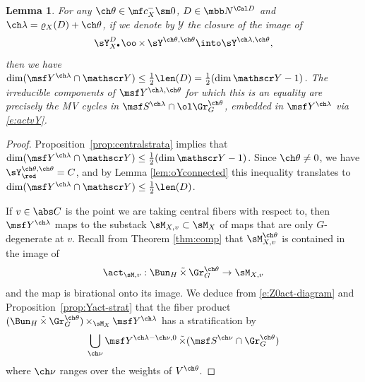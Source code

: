 \documentclass[final]{amsart}
\newtheorem{lem}[subsubsection]{Lemma}
\theoremstyle{remark}
\theoremstyle{definition}
\DeclareMathOperator*{\ttimes}{\tilde\times}
\DeclareMathOperator*{\xt}{\times}
\numberwithin{equation}{section}
\begin{document}
\begin{lem} \label{lem:centralfibertheta}
For any $\ch\theta \in \mf c_X^- \sm 0$, $D\in \mbb N^{\Cal D}$
and $\ch\lambda = \varrho_X(D) +\ch\theta$, if we denote by $\mathscr Y$ the closure of the image of 
\[\sY^{D}_{X^\bullet} \oo\xt \sY^{\ch\theta,\ch\theta} \into \sY^{\ch\lambda,\ch\theta},
\]
then we have $\dim (\msf Y^{\ch\lambda}\cap \mathscr Y) \le \frac 1 2\len(D) = \frac 1 2(\dim \mathscr Y -1)$. The irreducible components of $\msf Y^{\ch\lambda,\ch\theta}$ for which this is an equality are precisely 
the MV cycles in $\msf S^{\ch\lambda}\cap \ol\Gr^{\ch\theta}_G$, 
embedded in $\msf Y^{\ch\lambda}$ via \eqref{e:actvY}.
\end{lem}
\begin{proof}
Proposition~\ref{prop:centralstrata} implies that $\dim(\msf Y^{\ch\lambda} \cap \mathscr Y)
\le \frac 1 2(\dim \mathscr Y -1)$. 
Since $\ch\theta\ne 0$, we have $\sY^{\ch\theta,\ch\theta}_\red=C$,  and by Lemma \ref{lem:oYconnected} this inequality translates to 
$\dim(\msf Y^{\ch\lambda} \cap \mathscr Y) \le \frac 1 2 \len(D)$. 

If $v\in \abs C$ is the point we are taking central fibers with respect to,
then $\msf Y^{\ch\lambda}$ maps to 
the substack $\sM_{X,v}\subset \sM_{X}$ of maps that are only $G$-degenerate at $v$. 
Recall from Theorem \ref{thm:comp} that $\sM_{X,v}^{\ch\theta}$ 
is contained in the image of 
\[ 
    \act_{\sM,v} : \Bun_{H} \ttimes \Gr_{G}^{\ch\theta} \to \sM_{X,v} 
\]
and the map is birational onto its image. 
We deduce from \eqref{e:Z0act-diagram} and 
Proposition~\ref{prop:Yact-strat} that the fiber product 
$(\Bun_{H} \ttimes \Gr^{\ch\theta}_G) \xt_{\sM_{X}} \msf Y^{\ch\lambda}$ 
has a stratification by 
\[ \bigcup_{\ch\nu} \msf Y^{\ch\lambda-\ch\nu,0} \ttimes (\msf S^{\ch\nu} \cap \Gr^{\ch\theta}_G) 
\] 
where $\ch\nu$ ranges over the weights of $V^{\ch\theta}$.  


\end{proof}
\end{document}
